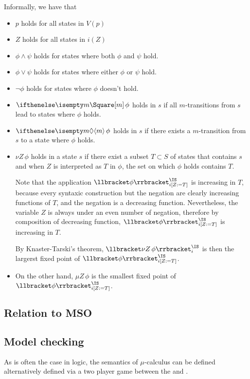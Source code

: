 Informally, we have that
\begin{itemize}
    \item $p$ holds for all states in $V(p)$
    \item $Z$ holds for all states in $i(Z)$
    \item $\phi \wedge \psi$ holds for states where both $\phi$ and $\psi$ hold.
    \item $\phi \vee \psi$ holds for states where either $\phi$ or $\psi$ hold.
    \item $\neg \phi$ holds for states where $\phi$ doesn't hold.
    \item $\boite m \phi$ holds in $s$ if all $m$-transitions from $s$ lead to states where $\phi$ holds.
    \item $\diam m \phi$ holds in $s$ if there exists a $m$-transition from $s$ to a state where $\phi$ holds.
    \item $\nu Z \, \phi$ holds in a state $s$
        if there exist a subset $T \subset S$ of states
        that contains $s$ and when $Z$ is interpreted as $T$
        in $\phi$, the set on which $\phi$ holds contains $T$.

        Note that the application
        $\Meaning{\phi}^\IS_{i[Z := T]}$ is increasing in $T$,
        because every syntaxic construction but the negation are clearly
        increasing functions of $T$, and the negation is a decreasing
        function. Nevertheless, the variable $Z$ is always under an even number of
        negation, therefore by composition of decreasing function,
        $\Meaning{\phi}^\IS_{i[Z := T]}$ is increasing in $T$.

        By Knaster-Tarski's theorem, $\Meaning{\nu Z\, \phi}^\IS_i$
        is then the largerst fixed point of $\Meaning{\phi}^\IS_{i[Z := T]}$.
    \item On the other hand, $\mu Z \, \phi$ is the smallest fixed point
        of $\Meaning{\phi}^\IS_{i[Z := T]}$.
\end{itemize}

\subsection{Relation to MSO}
\subsection{Model checking}

As is often the case in logic,
the semantics of $\mu$-calculus can
be defined alternatively defined via a two player game
between the \Verifier and \Falsifier.

